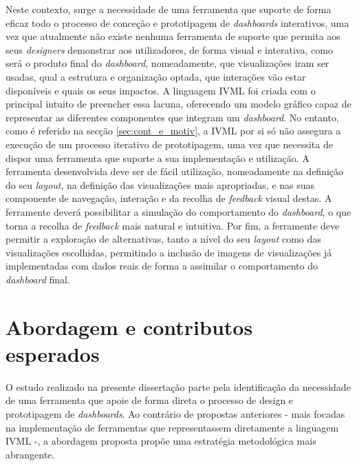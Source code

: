 Neste contexto, surge a necessidade de uma ferramenta que suporte de forma eficaz todo o processo de conceção e prototipagem de \textit{dashboards} interativos, uma vez que atualmente não existe nenhuma ferramenta de suporte que permita aos seus \textit{designers} demonstrar aos utilizadores, de forma visual e interativa, como será o produto final do \textit{dashboard}, nomeadamente, que visualizações iram ser usadas, qual a estrutura e organização optada, que interações vão estar disponíveis e quais os seus impactos. A linguagem \gls{IVML} foi criada com o principal intuito de preencher essa lacuna, oferecendo um modelo gráfico capaz de representar as diferentes componentes que integram um \textit{dashboard}. No entanto, como é referido na secção \ref{sec:cont_e_motiv}, a \gls{IVML} por si só não assegura a execução de um processo iterativo de prototipagem, uma vez que necessita de dispor uma ferramenta que suporte a sua implementação e utilização. A ferramenta desenvolvida deve ser de fácil utilização, nomeadamente na definição do seu \textit{layout}, na definição das visualizações mais apropriadas, e nas suas componente de navegação, interação e da recolha de \textit{feedback} visual destas. A ferramente deverá possibilitar a simulação do comportamento do \textit{dashboard}, o que torna a recolha de \textit{feedback} mais natural e intuitiva. Por fim, a ferramente deve permitir a exploração de alternativas, tanto a nível do seu \textit{layout} como das visualizações escolhidas, permitindo a inclusão de imagens de visualizações já implementadas com dados reais de forma a assimilar o comportamento do \textit{dashboard} final.

\section{Abordagem e contributos esperados}
\label{sec:contribuicoes}

O estudo realizado na presente dissertação parte pela identificação da necessidade de uma ferramenta que apoie de forma direta o processo de design e prototipagem de \textit{dashboards}. Ao contrário de propostas anteriores - mais focadas na implementação de ferramentas que representassem diretamente a linguagem \gls{IVML} -, a abordagem proposta propõe uma estratégia metodológica mais abrangente.

